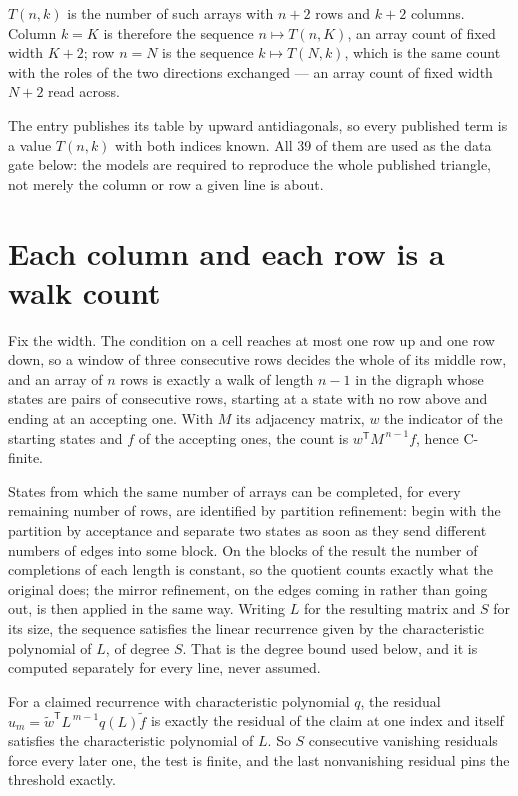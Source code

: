 \documentclass[11pt]{article}
\theoremstyle{definition}
\begin{document}
$T(n,k)$ is the number of such arrays with $n + 2$ rows and $k + 2$ columns. Column $k = K$ is therefore the sequence $n \mapsto T(n,K)$, an array count of fixed width $K + 2$; row $n = N$ is the sequence $k \mapsto T(N,k)$, which is the same count with the roles of the two directions exchanged --- an array count of fixed width $N + 2$ read across.

The entry publishes its table by upward antidiagonals, so every published term is a value $T(n,k)$ with both indices known. All 39 of them are used as the data gate below: the models are required to reproduce the whole published triangle, not merely the column or row a given line is about.

\section{Each column and each row is a walk count}

Fix the width. The condition on a cell reaches at most one row up and one row down, so a window of three consecutive rows decides the whole of its middle row, and an array of $n$ rows is exactly a walk of length $n-1$ in the digraph whose states are pairs of consecutive rows, starting at a state with no row above and ending at an accepting one. With $M$ its adjacency matrix, $w$ the indicator of the starting states and $f$ of the accepting ones, the count is $w^{\mathsf T}M^{\,n-1}f$, hence C-finite.

States from which the same number of arrays can be completed, for every remaining number of rows, are identified by partition refinement: begin with the partition by acceptance and separate two states as soon as they send different numbers of edges into some block. On the blocks of the result the number of completions of each length is constant, so the quotient counts exactly what the original does; the mirror refinement, on the edges coming in rather than going out, is then applied in the same way. Writing $L$ for the resulting matrix and $S$ for its size, the sequence satisfies the linear recurrence given by the characteristic polynomial of $L$, of degree $S$. That is the degree bound used below, and it is computed separately for every line, never assumed.

For a claimed recurrence with characteristic polynomial $q$, the residual $u_m = \tilde w^{\mathsf T}L^{\,m-1}q(L)\tilde f$ is exactly the residual of the claim at one index and itself satisfies the characteristic polynomial of $L$. So $S$ consecutive vanishing residuals force every later one, the test is finite, and the last nonvanishing residual pins the threshold exactly.
\end{document}
